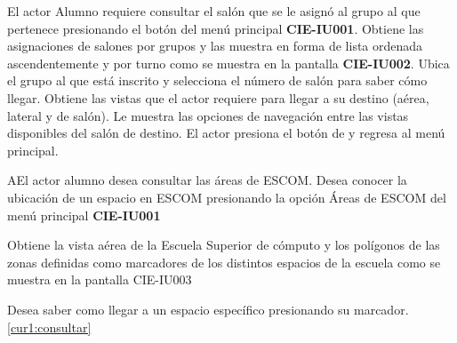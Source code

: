  \begin{UCtrayectoria}
    \UCpaso[\UCactor] El actor Alumno requiere consultar el salón que se le asignó al grupo al que pertenece presionando el botón  del menú principal \textbf{CIE-IU001}.  
    \UCpaso[\UCsist] Obtiene las asignaciones de salones por grupos y las muestra en forma de lista ordenada ascendentemente y por turno como se muestra en la pantalla \textbf{CIE-IU002}. 
    \UCpaso[\UCactor] Ubica el grupo al que está inscrito y selecciona el número de salón para saber cómo llegar.
    \UCpaso[\UCsist] Obtiene las vistas que el actor requiere para llegar a su destino (aérea, lateral y de salón). \label{cur1:consultar}
    \UCpaso[\UCsist] Le muestra las opciones de navegación entre las vistas disponibles del salón de destino.
	\UCpaso[\UCactor] El actor presiona el botón de  y regresa al menú principal.
 \end{UCtrayectoria}

 \begin{UCtrayectoriaA}{A}{El actor alumno desea consultar las áreas de ESCOM.}
    \UCpaso[\UCactor] Desea conocer la ubicación de un espacio en ESCOM presionando la opción Áreas de ESCOM del menú principal \textbf{CIE-IU001}
    
   \UCpaso[\UCsist] Obtiene la vista aérea de la Escuela Superior de cómputo y los polígonos de las zonas definidas como marcadores de los distintos espacios de la escuela como se muestra en la pantalla CIE-IU003
   
   \UCpaso[\UCactor] Desea saber como llegar a un espacio específico presionando su marcador. \ref{cur1:consultar}
 \end{UCtrayectoriaA}
 

 
%
%
 

